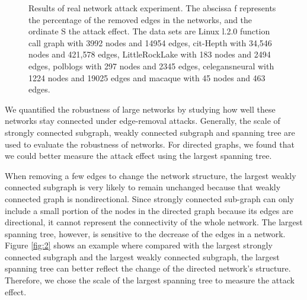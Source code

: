 \documentclass[aps,prl,twocolumn,showpacs,superscriptaddress,groupedaddress]{revtex4}  %
\begin{document}
\begin{figure*}[htbp]
\centering
{}
\caption{Results of real network attack experiment. The abscissa f represents the percentage of the removed edges in the networks, and the ordinate S the attack effect. The data sets are Linux l.2.0 function call graph\cite{Wang2014} with 3992 nodes and 14954 edges, cit-Hepth\cite{Leskovec2005Graphs} with 34,546 nodes and 421,578 edges, LittleRockLake\cite{Martinez1991Artifacts}  with 183 nodes and 2494 edges, polblogs\cite{Adamic2005The} with 297 nodes and 2345 edges, celegansneural\cite{Watts1998Collective} with 1224 nodes and 19025 edges and macaque\cite{Patric2008Mapping} with 45 nodes and 463 edges.} \label{fig:3}
\end{figure*}

We quantified the robustness of large networks by studying how well these networks stay connected under edge-removal attacks. Generally, the scale of strongly connected subgraph, weakly connected subgraph and spanning tree \cite{Camerini1978The} are used to evaluate the robustness of networks. For directed graphs, we found that we could better measure the attack effect using the largest spanning tree.


When removing a few edges to change the network structure, the largest weakly connected subgraph is very likely to remain unchanged because that weakly connected graph is nondirectional. Since strongly connected sub-graph can only include a small portion of the nodes in the directed graph because its edges are directional, it cannot represent the connectivity of the whole network. The largest spanning tree, however, is sensitive to the decrease of the edges in a network. Figure \ref{fig:2} shows an example where compared with the largest strongly connected subgraph and the largest weakly connected subgraph, the largest spanning tree can better reflect the change of the directed network's structure. Therefore, we chose the scale of the largest
spanning tree to measure the attack effect.
\end{document}
